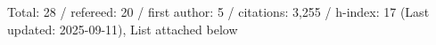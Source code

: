 Total: 28 / refereed: 20 / first author: 5 / citations: 3,255 / h-index: 17 (Last updated: 2025-09-11), List attached below